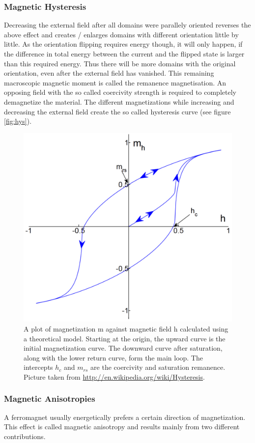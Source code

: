 \documentclass[a4paper]{scrartcl}
\numberwithin{equation}{section}
\numberwithin{figure}{section}
\numberwithin{table}{section}
\begin{document}
\subsubsection*{Magnetic Hysteresis}
Decreasing the external field after all domains were parallely oriented reverses the above effect and creates / enlarges domains with different orientation little by little. As the orientation flipping requires energy though, it will only happen, if the difference in total energy between the current and the flipped state is larger than this required energy. Thus there will be more domains with the original orientation, even after the external field has vanished. This remaining macroscopic magnetic moment is called the remanence magnetisation. An opposing field with the so called coercivity strength is required to completely demagnetize the material. The different magnetizations while increasing and decreasing the external field create the so called hysteresis curve (see figure \ref{fig:hys}).
\begin{figure}
        \begin{center}
         \includegraphics[width=0.31\linewidth]{img/hys.pdf}
        \end{center}
        \caption{
\small A plot of magnetization m against magnetic field h calculated using a theoretical model. Starting at the origin, the upward curve is the initial magnetization curve. The downward curve after saturation, along with the lower return curve, form the main loop. The intercepts $h_c$ and $m_{rs}$ are the coercivity and saturation remanence. Picture taken from \url{http://en.wikipedia.org/wiki/Hysteresis}.
        }
        \label{fig:doms}
\end{figure}


\subsubsection*{Magnetic Anisotropies}
A ferromagnet usually energetically prefers a certain direction of magnetization. This effect is called magnetic anisotropy and results mainly from two different contributions.
\end{document}
